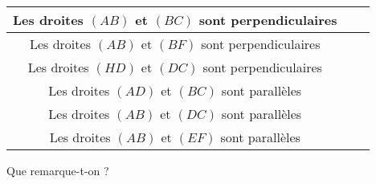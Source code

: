 \begin{myenumerate}
\begin{center}
\begin{tabular}{|c|c|c|}
\hline
Les droites $(AB)$ et $(BC)$ sont perpendiculaires&&\\
\hline
Les droites $(AB)$ et $(BF)$ sont perpendiculaires&&\\
\hline
Les droites $(HD)$ et $(DC)$ sont perpendiculaires&&\\
\hline
Les droites $(AD)$ et $(BC)$ sont parallèles&&\\
\hline
Les droites $(AB)$ et $(DC)$ sont parallèles&&\\
\hline
Les droites $(AB)$ et $(EF)$ sont parallèles&&\\
\hline
\end{tabular}
\end{center}
\par Que remarque-t-on ?\dotfill\par\dotfill
\begin{center}
\end{center}
\end{myenumerate}

